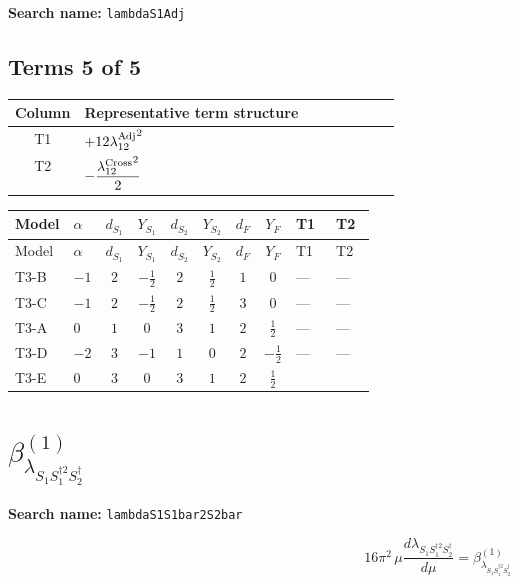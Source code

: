 \documentclass[8pt]{article}
\begin{document}
\begin{landscape}
\begin{longtable}{@{}llcccccc >{\raggedright\arraybackslash}p{0.21\linewidth} >{\raggedright\arraybackslash}p{0.21\linewidth} >{\raggedright\arraybackslash}p{0.21\linewidth}@{}}
\midrule
\bottomrule
\end{longtable}
\clearpage
\noindent\textbf{Search name: }\texttt{lambdaS1Adj}\par\smallskip
\subsection*{Terms 5 of 5}
\begin{center}
\begin{tabular}{@{}c >{\raggedright\arraybackslash}p{0.82\linewidth}@{}}
\toprule
Column & Representative term structure \\
\midrule
T1 & \(\displaystyle +12 {\lambda_{12}^{\rm Adj}}^2\) \\
\midrule
T2 & \(\displaystyle -\frac{{\lambda_{12}^{\rm Cross}}^2}{2}\) \\
\midrule
\bottomrule
\end{tabular}
\end{center}
\smallskip
\tiny
\begin{longtable}{@{}llcccccc >{\raggedright\arraybackslash}p{0.21\linewidth} >{\raggedright\arraybackslash}p{0.21\linewidth}@{}}
\toprule
Model & $\alpha$ & $d_{S_1}$ & $Y_{S_1}$ & $d_{S_2}$ & $Y_{S_2}$ & $d_F$ & $Y_F$ & T1 & T2 \\
\midrule
\endfirsthead
\toprule
Model & $\alpha$ & $d_{S_1}$ & $Y_{S_1}$ & $d_{S_2}$ & $Y_{S_2}$ & $d_F$ & $Y_F$ & T1 & T2 \\
\midrule
\endhead
T3-B & $-1$ & $2$ & $-\frac{1}{2}$ & $2$ & $\frac{1}{2}$ & $1$ & $0$ & --- & --- \\
\midrule
T3-C & $-1$ & $2$ & $-\frac{1}{2}$ & $2$ & $\frac{1}{2}$ & $3$ & $0$ & --- & --- \\
\midrule
T3-A & $0$ & $1$ & $0$ & $3$ & $1$ & $2$ & $\frac{1}{2}$ & --- & --- \\
\midrule
T3-D & $-2$ & $3$ & $-1$ & $1$ & $0$ & $2$ & $-\frac{1}{2}$ & --- & --- \\
\midrule
T3-E & $0$ & $3$ & $0$ & $3$ & $1$ & $2$ & $\frac{1}{2}$ & \scriptsize\adjustbox{max width=\linewidth}{$\begin{gathered} +12 {\lambda_{12}^{\rm Adj}}^2\end{gathered}$} & \scriptsize\adjustbox{max width=\linewidth}{$\begin{gathered} -\frac{{\lambda_{12}^{\rm Cross}}^2}{2}\end{gathered}$} \\
\midrule
\bottomrule
\end{longtable}
\clearpage
\section*{$\beta_{\lambda_{S_1 S_1^{\dagger 2}S_2^\dagger}}^{(1)}$}
\noindent\textbf{Search name: }\texttt{lambdaS1S1bar2S2bar}\par\smallskip
\[16\pi^2\,\mu\frac{d \lambda_{S_1 S_1^{\dagger 2}S_2^\dagger}}{d\mu}=\beta_{\lambda_{S_1 S_1^{\dagger 2}S_2^\dagger}}^{(1)}\]

\end{landscape}
\end{document}
